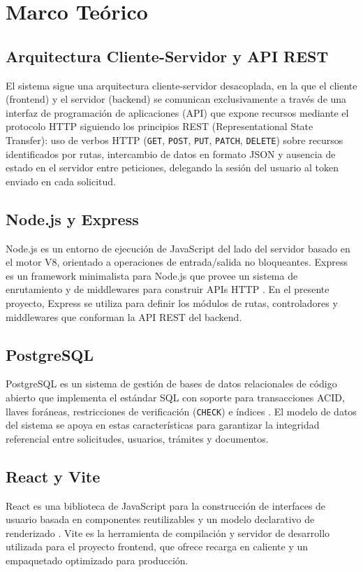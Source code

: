 \section{Marco Teórico}

\subsection{Arquitectura Cliente-Servidor y API REST}
El sistema sigue una arquitectura cliente-servidor desacoplada, en la que el
cliente (frontend) y el servidor (backend) se comunican exclusivamente a
través de una interfaz de programación de aplicaciones (API) que expone
recursos mediante el protocolo HTTP siguiendo los principios REST
(Representational State Transfer): uso de verbos HTTP (\texttt{GET},
\texttt{POST}, \texttt{PUT}, \texttt{PATCH}, \texttt{DELETE}) sobre recursos
identificados por rutas, intercambio de datos en formato JSON y ausencia de
estado en el servidor entre peticiones, delegando la sesión del usuario al
token enviado en cada solicitud.

\subsection{Node.js y Express}
Node.js es un entorno de ejecución de JavaScript del lado del servidor basado
en el motor V8, orientado a operaciones de entrada/salida no bloqueantes.
Express es un framework minimalista para Node.js que provee un sistema de
enrutamiento y de middlewares para construir APIs HTTP \parencite{expressdocs}.
En el presente proyecto, Express se utiliza para definir los módulos de rutas,
controladores y middlewares que conforman la API REST del backend.

\subsection{PostgreSQL}
PostgreSQL es un sistema de gestión de bases de datos relacionales de código
abierto que implementa el estándar SQL con soporte para transacciones ACID,
llaves foráneas, restricciones de verificación (\texttt{CHECK}) e índices
\parencite{postgresqldocs}. El modelo de datos del sistema se apoya en estas
características para garantizar la integridad referencial entre solicitudes,
usuarios, trámites y documentos.

\subsection{React y Vite}
React es una biblioteca de JavaScript para la construcción de interfaces de
usuario basada en componentes reutilizables y un modelo declarativo de
renderizado \parencite{reactdocs}. Vite es la herramienta de compilación y
servidor de desarrollo utilizada para el proyecto frontend, que ofrece
recarga en caliente y un empaquetado optimizado para producción.

